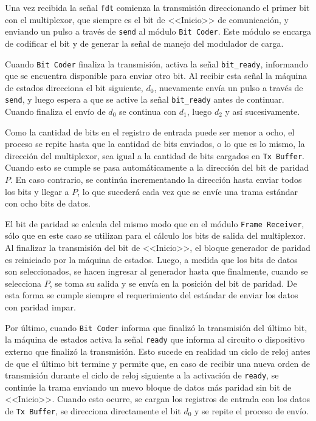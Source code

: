 Una vez recibida la señal \lstinline{fdt} comienza la transmisión 
direccionando el primer bit con el multiplexor, que siempre es el 
bit de <<Inicio>> de comunicación, y enviando un 
pulso a través de \lstinline{send} al módulo \lstinline{Bit Coder}. 
Este módulo se encarga de codificar el bit y de generar la señal de 
manejo del modulador de carga. 

Cuando \lstinline{Bit Coder} finaliza la transmisión, activa 
la señal \lstinline{bit_ready}, informando que se encuentra disponible 
para enviar otro bit. Al recibir esta señal la máquina de estados 
direcciona el bit siguiente, \(d_{0}\), nuevamente envía un pulso a 
través de \lstinline{send}, y luego espera a que se active la señal 
\lstinline{bit_ready} antes de continuar. Cuando finaliza el envío de 
\(d_{0}\) se continua con \(d_{1}\), luego \(d_{2}\) y así 
sucesivamente.

Como la cantidad de bits en el registro de entrada puede ser menor a 
ocho, el proceso se repite hasta que la cantidad de bits enviados, o lo 
que es lo mismo, la dirección del multiplexor, sea igual a la cantidad 
de bits cargados en \lstinline{Tx Buffer}. Cuando esto se cumple se 
pasa automáticamente a la dirección del bit de paridad \(P\). En caso 
contrario,  
se continúa incrementando la dirección hasta enviar todos los bits y 
llegar a \(P\), lo que sucederá cada vez que se envíe una trama 
estándar con ocho bits de datos.

El bit de paridad se calcula del mismo modo que en el módulo 
\lstinline{Frame Receiver}, sólo que en este caso se utilizan para 
el cálculo los bits de salida del multiplexor. Al finalizar la 
transmisión del bit de <<Inicio>>, el bloque generador de paridad es 
reiniciado por la máquina de estados. Luego, a medida que los bits 
de datos son seleccionados, se hacen ingresar al generador hasta que 
finalmente, cuando se selecciona \(P\), se toma su salida y se envía 
en la posición del bit de paridad. De esta forma se cumple siempre el 
requerimiento del estándar de enviar los datos con paridad impar.

Por último, cuando \lstinline{Bit Coder} informa que finalizó
la transmisión del último bit, la máquina de estados activa la señal 
\lstinline{ready} que informa al circuito o dispositivo externo que finalizó la 
transmisión. Esto sucede en realidad un ciclo de reloj antes de que el 
último bit termine y permite que, en caso de recibir una nueva orden de 
transmisión durante el ciclo de reloj siguiente a la activación de 
\lstinline{ready}, se continúe la trama enviando un nuevo bloque de 
datos más paridad sin bit de <<Inicio>>. Cuando esto ocurre, se cargan
los registros de entrada con los datos de \lstinline{Tx Buffer}, se 
direcciona directamente el bit \(d_{0}\) y se repite el proceso de 
envío.

